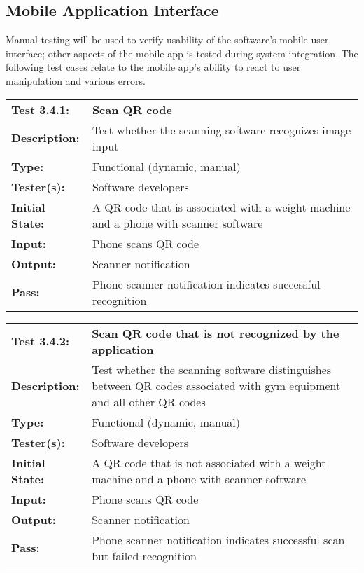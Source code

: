 \documentclass{article}
\newenvironment{testcase}
    {
    \begin{center}
    \begin{mdframed}[
        userdefinedwidth=15.5cm,
        leftmargin=1cm,
        rightmargin=1cm
        ]
    \begin{tabular}{p{2.5cm} p{9cm}}
    }
    {
    \end{tabular}
    \end{mdframed}
    \end{center}
    }
\newcommand{\tctit}[2]{\textbf{#1} & \textbf{#2}}
\newcommand{\tcdesc}{\textbf{Description:}}
\newcommand{\tctype}{\textbf{Type:}}
\newcommand{\testers}{\textbf{Tester(s):}}
\newcommand{\tcinit}{\textbf{Initial State:}}
\newcommand{\tcin}{\textbf{Input:}}
\newcommand{\tcout}{\textbf{Output:}}
\newcommand{\tcpass}{\textbf{Pass:}}
\begin{document}
\subsection{Mobile Application Interface}
Manual testing will be used to verify usability of the software’s mobile user interface; other aspects of the mobile app is tested during system integration. The following test cases relate to the mobile app’s ability to react to user manipulation and various errors.

\begingroup
\begin{testcase}
\tctit{Test 3.4.1:}{Scan QR code} \\
\tcdesc & Test whether the scanning software recognizes image input \\
\tctype & Functional (dynamic, manual) \\
\testers & Software developers \\
\tcinit & A QR code that is associated with a weight machine and a phone with scanner software\\ \tcin & Phone scans QR code \\
\tcout & Scanner notification \\
\tcpass & Phone scanner notification indicates successful recognition \\
\end{testcase}
\endgroup

\begingroup
\begin{testcase}
\tctit{Test 3.4.2:}{Scan QR code that is not recognized by the application} \\
\tcdesc & Test whether the scanning software distinguishes between QR codes associated with gym equipment and all other QR codes \\
\tctype & Functional (dynamic, manual) \\
\testers & Software developers \\
\tcinit & A QR code that is not associated with a weight machine and a phone with scanner software\\
\tcin & Phone scans QR code \\
\tcout & Scanner notification\\
\tcpass & Phone scanner notification indicates successful scan but failed recognition \\
\end{testcase}
\endgroup
\end{document}
